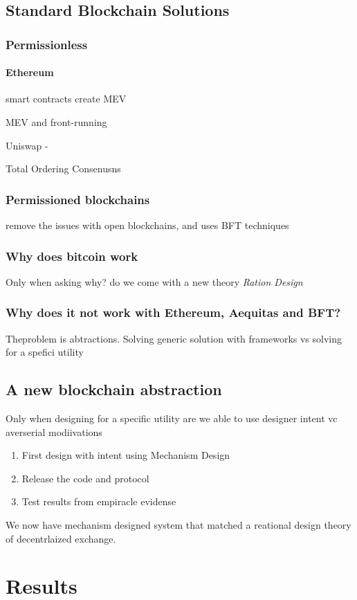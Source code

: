 \documentclass[12pt]{article}
\begin{document}
\subsection{Standard Blockchain Solutions} 

\subsubsection{Permissionless} 

\paragraph*{Ethereum} smart contracts create MEV

MEV and front-running 

Uniswap - 

Total Ordering Consenusns 

\subsubsection{Permissioned blockchains} remove the issues with open blockchains, and uses BFT techniques 


\subsubsection{Why does bitcoin work} 
Only when asking why? do we come with a new theory \emph{Ration Design}

\subsubsection{Why does it not work with Ethereum, Aequitas and BFT?}
Theproblem is abtractions. Solving generic solution with frameworks vs solving for a spefici utility 

\subsection{A new blockchain abstraction} 
Only when designing for a specific utility are we able to use designer intent vc averserial modiivations 

\begin{enumerate}
    \item First design with intent using Mechanism Design 
    \item Release the code and protocol
    \item Test results from empiracle evidense 
  \end{enumerate}

We now have mechanism designed system that matched a reational design theory of decentrlaized exchange. 


\section{Results}
\cite{ChenA} 
\newpage
{}

% 
\end{document}
